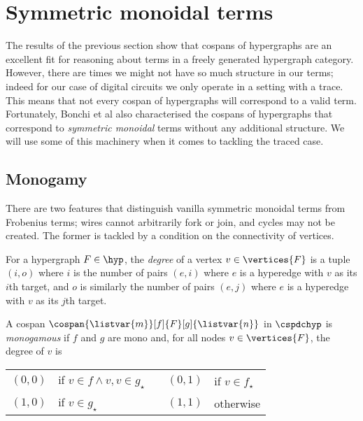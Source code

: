 \section{Symmetric monoidal terms}

The results of the previous section show that cospans of hypergraphs are an
excellent fit for reasoning about terms in a freely generated hypergraph
category.
However, there are times we might not have so much structure in our terms;
indeed for our case of digital circuits we only operate in a setting with a
trace.
This means that not every cospan of hypergraphs will correspond to a valid term.
Fortunately, Bonchi et al also characterised the cospans of hypergraphs that
correspond to \emph{symmetric monoidal} terms without any additional structure.
We will use some of this machinery when it comes to tackling the traced case.

\subsection{Monogamy}

There are two features that distinguish vanilla symmetric monoidal terms from
Frobenius terms; wires cannot arbitrarily fork or join, and cycles may not be
created.
The former is tackled by a condition on the connectivity of vertices.

\begin{definition}
    For a hypergraph \(F \in \hyp\), the \emph{degree} of a vertex
    \(v \in \vertices{F}\) is a tuple \((i,o)\) where \(i\) is the number of
    pairs \((e,i)\) where \(e\) is a hyperedge with \(v\) as its \(i\)th target,
    and \(o\) is similarly the number of pairs \((e,j)\) where \(e\) is a
    hyperedge with \(v\) as its \(j\)th target.
\end{definition}

\begin{definition}
    A cospan \(\cospan{\listvar{m}}[f]{F}[g]{\listvar{n}}\) in \(\cspdchyp\) is
    \emph{monogamous} if \(f\) and \(g\) are mono and, for all nodes
    \(v \in \vertices{F}\), the degree of \(v\) is
    \begin{center}
        \begin{tabular}{rlcrl}
            \((0,0)\)
            &
            if \(v \in f \wedge v, v \in g_\star\)
            &
            \quad
            &
            \((0,1)\)
            &
            if \(v \in f_\star\)
            \\
            \((1,0)\)
            &
            if \(v \in g_\star\)
            &
            \quad
            &
            \((1,1)\)
            &
            otherwise
        \end{tabular}
    \end{center}
\end{definition}

